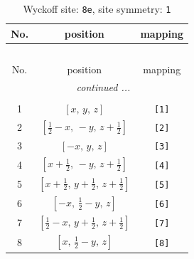 \documentclass[fleqn,8pt]{jsarticle}
\begin{document}
\renewcommand{\arraystretch}{1.2}
\begin{longtable}{ccc}
\caption{Wyckoff site: {\tt 8e}, site symmetry: {\tt 1}}
 \\
 \hline \hline
No. & position & mapping \\ \hline \endfirsthead

\multicolumn{2}{l}{\tablename\ \thetable{}} \\
 \hline \hline
No. & position & mapping \\ \hline \endhead

 \hline \hline
\multicolumn{2}{r}{\footnotesize\it continued ...} \\ \endfoot

 \hline \hline
\multicolumn{2}{r}{} \\ \endlastfoot

1 & $\left[ x,\, y,\, z \right]$ & {\tt [1]} \\ \hline
2 & $\left[ \frac{1}{2} - x,\, - y,\, z + \frac{1}{2} \right]$ & {\tt [2]} \\ \hline
3 & $\left[ - x,\, y,\, z \right]$ & {\tt [3]} \\ \hline
4 & $\left[ x + \frac{1}{2},\, - y,\, z + \frac{1}{2} \right]$ & {\tt [4]} \\ \hline
5 & $\left[ x + \frac{1}{2},\, y + \frac{1}{2},\, z + \frac{1}{2} \right]$ & {\tt [5]} \\ \hline
6 & $\left[ - x,\, \frac{1}{2} - y,\, z \right]$ & {\tt [6]} \\ \hline
7 & $\left[ \frac{1}{2} - x,\, y + \frac{1}{2},\, z + \frac{1}{2} \right]$ & {\tt [7]} \\ \hline
8 & $\left[ x,\, \frac{1}{2} - y,\, z \right]$ & {\tt [8]} \\
\end{longtable}
\end{document}
